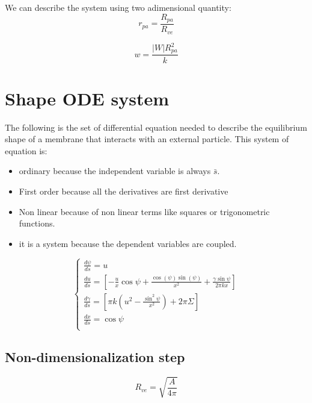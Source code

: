 \documentclass[12pt]{article}
\begin{document}
We can describe the system using two adimensional quantity:
$$
r_{pa} = \frac{R_{pa}}{R_{ve}}
$$

$$
w = \frac{|W| R_{pa}^2}{k}
$$

\section{Shape ODE system}
The following is the set of differential equation needed to describe the equilibrium shape of a membrane that interacts with an external particle. This system of equation is:
\begin{itemize}
    \item ordinary because the independent variable is always $\bar{s}$.
    \item First order because all the derivatives are first derivative
    \item Non linear because of non linear terms like squares or trigonometric functions.
    \item it is a system because the dependent variables are coupled.
\end{itemize}


\begin{equation}
  \begin{cases} 
    \frac{d\psi}{ds} =  u \\[3mm]
    \frac{du}{ds} =  [-\frac{u}{x}\cos\psi+\frac{\cos(\psi)\sin(\psi)}{x^2}+\frac{\gamma\sin \psi}{2\pi k x}] \\[3mm]
    \frac{d\gamma}{ds} =  [\pi k (u^2-\frac{\sin^2 \psi}{x^2})+2 \pi \Sigma] \\[3mm]
    \frac{dx}{ds} =  \cos \psi \\[3mm]
  \end{cases}
\end{equation}






\subsection{Non-dimensionalization step}
$$
R_{ve} = \sqrt{\frac{A}{4 \pi}}
$$
\end{document}
